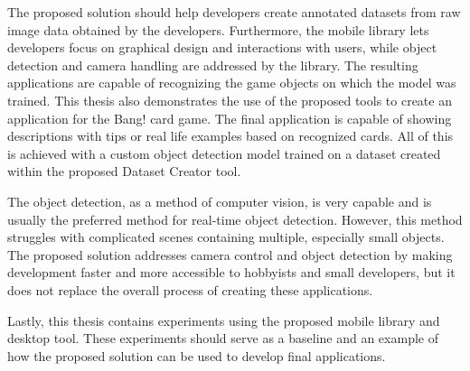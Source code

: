 The proposed solution should help developers create annotated datasets from raw image data obtained by the developers. Furthermore, the mobile library lets developers focus on graphical design and interactions with users, while object detection and camera handling are addressed by the library. The resulting applications are capable of recognizing the game objects on which the model was trained. This thesis also demonstrates the use of the proposed tools to create an application for the Bang! card game. The final application is capable of showing descriptions with tips or real life examples based on recognized cards. All of this is achieved with a custom object detection model trained on a dataset created within the proposed Dataset Creator tool.

The object detection, as a method of computer vision, is very capable and is usually the preferred method for real-time object detection. However, this method struggles with complicated scenes containing multiple, especially small objects. The proposed solution addresses camera control and object detection by making development faster and more accessible to hobbyists and small developers, but it does not replace the overall process of creating these applications.

Lastly, this thesis contains experiments using the proposed mobile library and desktop tool. These experiments should serve as a baseline and an example of how the proposed solution can be used to develop final applications.


